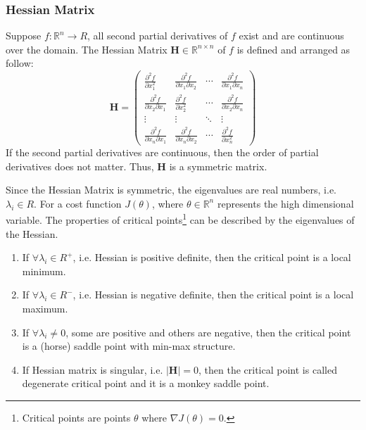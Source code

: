 \subsubsection{Hessian Matrix}
\begin{defn}
    \label{def:Hessian}
    Suppose $ f: \mathbb{R}^n\rightarrow R $, all second partial derivatives
    of $ f $ exist and are continuous over the domain. The Hessian Matrix 
    $ \mathbf{H} \in \mathbb{R}^{n\times n} $ of $ f $ is defined and arranged
    as follow:
    \begin{equation}
        \mathbf{H} =
        \begin{pmatrix}
            \frac{\partial^2f}{\partial x_1^2} & \frac{\partial^2f}{\partial x_1\partial x_2} & \cdots & \frac{\partial^2f}{\partial x_1\partial x_n} \\
            \frac{\partial^2f}{\partial x_2\partial x_1} & \frac{\partial^2f}{\partial x_2^2} & \cdots & \frac{\partial^2f}{\partial x_2\partial x_n} \\
            \vdots & \vdots & \ddots & \vdots \\
            \frac{\partial^2f}{\partial x_n\partial x_1} & \frac{\partial^2f}{\partial x_n\partial x_2} & \cdots & \frac{\partial^2f}{\partial x_n^2}
        \end{pmatrix}
    \end{equation}
    If the second partial derivatives are continuous, then the order of partial
    derivatives does not matter. Thus, $ \mathbf{H} $ is a symmetric matrix.
\end{defn}

\par Since the Hessian Matrix is symmetric, the eigenvalues are real numbers,
i.e. $ \lambda_i \in R $. For a cost function $ J(\theta) $, where 
$ \theta \in \mathbb{R}^n $ represents the high dimensional variable. The 
properties of critical points\footnote{Critical points are points 
$ \theta $ where $ \nabla J(\theta) = 0 $. } can be described by the eigenvalues
of the Hessian.
\begin{enumerate}
    \item If $ \forall \lambda_i \in R^+ $, i.e. Hessian is positive definite, then the critical point is a local minimum.
    \item If $ \forall \lambda_i \in R^- $, i.e. Hessian is negative definite, then the critical point is a local maximum.
    \item If $ \forall \lambda_i \neq 0 $, some are positive and others are negative,
        then the critical point is a (horse) saddle point with min-max structure.
    \item If Hessian matrix is singular, i.e. $ |\mathbf{H}| = 0 $, then
        the critical point is called degenerate critical point and it is 
        a monkey saddle point. 
\end{enumerate}

